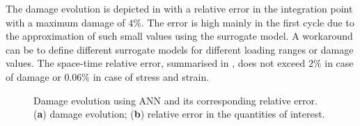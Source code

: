 The damage evolution is depicted in  with a relative error in the integration point with a maximum damage of $4\unit{\%}$. The error is high mainly in the first cycle due to the approximation of such small values using the surrogate model. A workaround can be to define different surrogate models for different loading ranges or damage values. The space-time relative error, summarised in , does not exceed $2\unit{\%}$ in case of damage or $0.06\unit{\%}$ in case of stress and strain.
\begin{figure}[hbt!]
	\centering
	\begin{subfigure}[t]{0.49\linewidth}
		
		\caption{}
		\label{fig_ann_1}
	\end{subfigure}
	\hfil
	\begin{subfigure}[t]{0.49\linewidth}
		
		\caption{}
		\label{fig_ann_2}
	\end{subfigure}
	\caption{Damage evolution using ANN and its corresponding relative error. (\textbf{a}) damage evolution; (\textbf{b}) relative error in the quantities of interest.}
	\label{fig_}
\end{figure}

